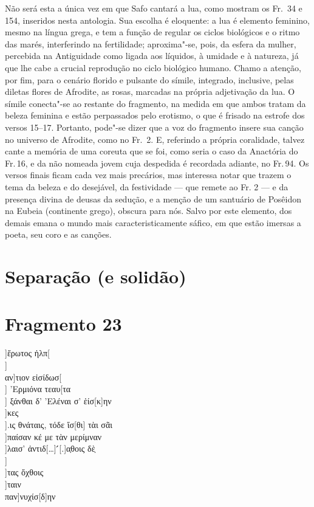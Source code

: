 {{Não será esta a única vez em que Safo cantará a lua,
como mostram os Fr.~34 e 154, inseridos nesta antologia. Sua escolha é
eloquente: a lua é elemento feminino, mesmo na língua grega, e tem a função de
regular os ciclos biológicos e o ritmo das marés, interferindo na fertilidade;
aproxima"-se, pois, da esfera da mulher, percebida na Antiguidade como ligada
aos líquidos, à umidade e à natureza, já que lhe cabe a crucial
reprodução no ciclo biológico humano. Chamo a atenção, por fim, para o cenário
florido e pulsante do símile, integrado, inclusive, pelas diletas flores de
Afrodite, as rosas, marcadas na própria adjetivação da lua. O símile conecta"-se
ao restante do fragmento, na medida em que ambos tratam da beleza feminina e
estão perpassados pelo erotismo, o que é frisado na estrofe dos versos 15--17.
Portanto, pode"-se dizer que a voz do fragmento insere sua canção no universo de
Afrodite, como no Fr.~2.
E, referindo a própria coralidade, talvez cante a memória de uma coreuta que se foi, como seria o caso da Anactória do Fr.\,16, e da não nomeada jovem cuja despedida é recordada adiante, no Fr.\,94.
Os versos finais ficam cada vez mais precários, mas interessa notar que trazem o tema da beleza e do desejável, da festividade --- que remete ao Fr. 2 --- e da presença divina de deusas da sedução, e a menção de um santuário de Posêidon na Eubeia (continente grego), obscura para nós. Salvo por este elemento, dos demais emana o mundo mais caracteristicamente sáfico, em que estão imersas a poeta, seu coro e as canções.}





\pagebreak
\section{Separação (e solidão)}
\section{Fragmento 23}

\begin{gkverse}
]ἕρωτος  ἠλπ[\\
		       ]\\
		   αν]τιον εἰσίδωσ[\\
		       ] ’Ερμιόνα τεαυ[τα\\
	   ] ξάνθαι δ’ ’Ελέναι σ’ ἑίσ[κ]ην\\
	]κες \\
	].ις θνάταις, τόδε ἴσ[θι] τὰι σᾶι\\
	]παίσαν κέ με τὰν μερίμναν\\
	]λαισ’ ἀντιδ[\ldots{}] ́́[.]α̣θοις δὲ̣\\
     ]\\
				]τας ὄχθοις\\
			          ]ταιν\\
			      παν]νυχίσ[δ]ην
\end{gkverse}

}
